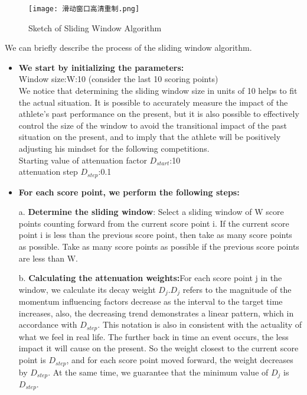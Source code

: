\documentclass{mcmthesis}
\begin{document}
\begin{figure}[htbp]
    \centering
    \texttt{[image: 滑动窗口高清重制.png]}
    \caption{Sketch of Sliding Window Algorithm} \label{Figure 18}
\end{figure}

We can briefly describe the process of the sliding window algorithm.
\begin{itemize}
    \item {\bf We start by initializing the parameters:}\\
    Window size:W:10 (consider the last 10 scoring points)\\
    We notice that determining the sliding window size in units of 10 helps to fit the actual
    situation. It is possible to accurately measure the impact of the athlete's past performance on
    the present, but it is also possible to effectively control the size of the window to avoid the
    transitional impact of the past situation on the present, and to imply that the athlete will be
    positively adjusting his mindset for the following competitions. \\
    Starting value of attenuation factor $D_{start}$:10\\
    attenuation step $D_{step}$:0.1\\
    \item {\bf For each score point, we perform the following steps:}
    \item[a.]{\bf Determine the sliding window}: Select a sliding window of W score points counting
    forward from the current score point i. If the current score point i is less than the previous
    score point, then take as many score points as possible. Take as many score points as possible
    if the previous score points are less than W.
    \item[b.]{\bf Calculating the attenuation weights:}For each score point j in the window, we calculate
    its decay weight $D_{j}$.$D_{j}$ refers to the magnitude of the momentum influencing factors decrease
    as the interval to the target time increases, also, the decreasing trend demonstrates a linear
    pattern, which in accordance with $D_{step}$. This notation is also in consistent with the actuality of what we feel in real life. The further back in time an event occurs, the less impact it will
    cause on the present. So the weight closest to the current score point is $D_{step}$, and for each score point moved forward, the weight decreases by $D_{step}$. At the same time, we guarantee
    that the minimum value of $D_{j}$ is $D_{step}$.


\end{itemize}
\end{document}

